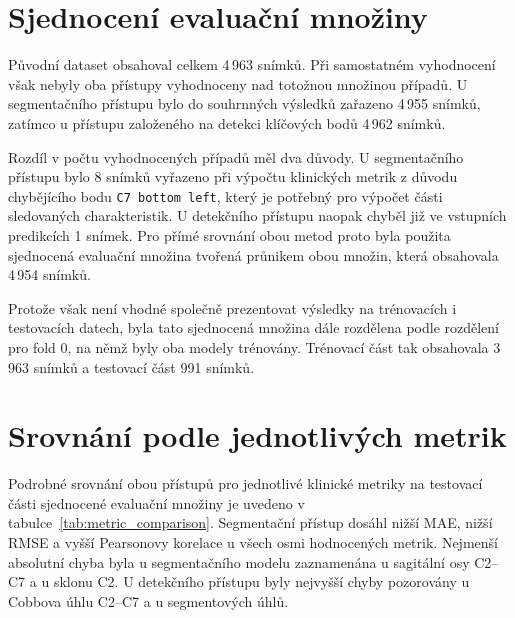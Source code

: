 \documentclass[male,czech,api_bc]{kitheses}
\begin{document}
\section{Sjednocení evaluační množiny}

Původní dataset obsahoval celkem 4\,963 snímků. Při samostatném vyhodnocení však nebyly oba přístupy vyhodnoceny nad totožnou množinou případů. U segmentačního přístupu bylo do souhrnných výsledků zařazeno 4\,955 snímků, zatímco u přístupu založeného na detekci klíčových bodů 4\,962 snímků.

Rozdíl v počtu vyhodnocených případů měl dva důvody. U segmentačního přístupu bylo 8 snímků vyřazeno při výpočtu klinických metrik z důvodu chybějícího bodu \texttt{C7 bottom left}, který je potřebný pro výpočet části sledovaných charakteristik. U detekčního přístupu naopak chyběl již ve vstupních predikcích 1 snímek. Pro přímé srovnání obou metod proto byla použita sjednocená evaluační množina tvořená průnikem obou množin, která obsahovala 4\,954 snímků.

Protože však není vhodné společně prezentovat výsledky na trénovacích i testovacích datech, byla tato sjednocená množina dále rozdělena podle rozdělení pro fold 0, na němž byly oba modely trénovány. Trénovací část tak obsahovala 3\,963 snímků a testovací část 991 snímků.

\section{Srovnání podle jednotlivých metrik}

Podrobné srovnání obou přístupů pro jednotlivé klinické metriky na testovací části sjednocené evaluační množiny je uvedeno v tabulce~\ref{tab:metric_comparison}. Segmentační přístup dosáhl nižší MAE, nižší RMSE a vyšší Pearsonovy korelace u všech osmi hodnocených metrik. Nejmenší absolutní chyba byla u segmentačního modelu zaznamenána u sagitální osy C2--C7 a u sklonu C2. U detekčního přístupu byly nejvyšší chyby pozorovány u Cobbova úhlu C2--C7 a u segmentových úhlů.
\end{document}
